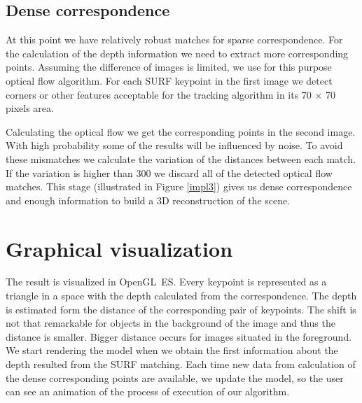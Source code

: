 

\subsection{Dense correspondence}
At this point we have relatively robust matches for sparse correspondence. 
For the calculation of the depth information we need to extract more corresponding points.
Assuming the difference of images is limited, we use for this purpose optical flow algorithm. 
For each SURF keypoint in the first image we detect corners or other features acceptable for the tracking algorithm in its 70 $\times$ 70 pixels area.

Calculating the optical flow we get the corresponding points in the second image.
With high probability some of the results will be influenced by noise.
To avoid these mismatches we calculate the variation of the distances between each match.
If the variation is higher than 300 we discard all of the detected optical flow matches.
This stage (illustrated in Figure \ref{impl3}) gives us dense correspondence and enough information to build a 3D reconstruction of the scene.

\section{Graphical visualization}
The result is visualized in OpenGL~ES.
Every keypoint is represented as a triangle in a space with the depth calculated from the correspondence.
The depth is estimated form the distance of the corresponding pair of keypoints. 
The shift is not that remarkable for objects in the background of the image and thus the distance is smaller.
Bigger distance occurs for images situated in the foreground.
We start rendering the model when we obtain the first information about the depth resulted from the SURF matching.
Each time new data from calculation of the dense corresponding points are available, we update the model, so the user can see an animation of the process of execution of our algorithm.


